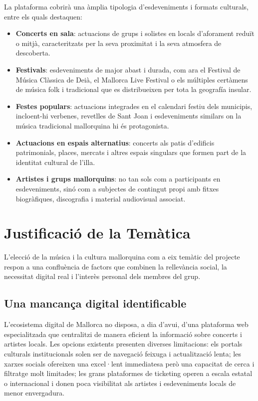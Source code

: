 La plataforma cobrirà una àmplia tipologia d'esdeveniments i formats culturals, entre els quals destaquen:

\begin{itemize}
    \item \textbf{Concerts en sala}: actuacions de grups i solistes en locals d'aforament reduït o mitjà, caracteritzats per la seva proximitat i la seva atmosfera de descoberta.
    \item \textbf{Festivals}: esdeveniments de major abast i durada, com ara el Festival de Música Clàssica de Deià, el Mallorca Live Festival o els múltiples certàmens de música folk i tradicional que es distribueixen per tota la geografía insular.
    \item \textbf{Festes populars}: actuacions integrades en el calendari festiu dels municipis, incloent-hi verbenes, revetlles de Sant Joan i esdeveniments similars on la música tradicional mallorquina hi és protagonista.
    \item \textbf{Actuacions en espais alternatius}: concerts als patis d'edificis patrimonials, places, mercats i altres espais singulars que formen part de la identitat cultural de l'illa.
    \item \textbf{Artistes i grups mallorquins}: no tan sols com a participants en esdeveniments, sinó com a subjectes de contingut propi amb fitxes biogràfiques, discografia i material audiovisual associat.
\end{itemize}

\section{Justificació de la Temàtica}

L'elecció de la música i la cultura mallorquina com a eix temàtic del projecte respon a una confluència de factors que combinen la rellevància social, la necessitat digital real i l'interès personal dels membres del grup.

\subsection{Una mancança digital identificable}

L'ecosistema digital de Mallorca no disposa, a dia d'avui, d'una plataforma web especialitzada que centralitzi de manera eficient la informació sobre concerts i artistes locals. Les opcions existents presenten diverses limitacions: els portals culturals institucionals solen ser de navegació feixuga i actualització lenta; les xarxes socials ofereixen una excel·lent immediatesa però una capacitat de cerca i filtratge molt limitades; les grans plataformes de ticketing operen a escala estatal o internacional i donen poca visibilitat als artistes i esdeveniments locals de menor envergadura.


